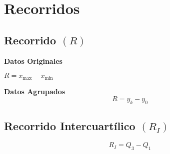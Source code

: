 \section{Recorridos}
\subsection{Recorrido $(R)$}
\begin{multicols}{2}
\textbf{Datos Originales} 
\begin{center}
$R=x_{\textrm{max}}-x_{\textrm{min}}$
\end{center}
\columnbreak
\textbf{Datos Agrupados}
$$R=y_{k}-y_{0}$$
\end{multicols}
\subsection{Recorrido Intercuartílico $(R_I)$}
$$R_I=Q_3-Q_1$$



